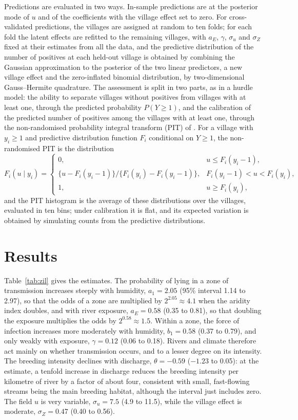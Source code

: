 \documentclass[11pt,a4paper]{article}
\begin{document}
Predictions are evaluated in two ways. In-sample predictions are at the posterior mode of $u$ and of the coefficients with the village effect set to zero. For cross-validated predictions, the villages are assigned at random to ten folds; for each fold the latent effects are refitted to the remaining villages, with $a_E$, $\gamma$, $\sigma_u$ and $\sigma_Z$ fixed at their estimates from all the data, and the predictive distribution of the number of positives at each held-out village is obtained by combining the Gaussian approximation to the posterior of the two linear predictors, a new village effect and the zero-inflated binomial distribution, by two-dimensional Gauss--Hermite quadrature. The assessment is split in two parts, as in a hurdle model: the ability to separate villages without positives from villages with at least one, through the predicted probability $P(Y \geq 1)$, and the calibration of the predicted number of positives among the villages with at least one, through the non-randomised probability integral transform (PIT) of \citet{czado2009}. For a village with $y_i \geq 1$ and predictive distribution function $F_i$ conditional on $Y \geq 1$, the non-randomised PIT is the distribution
\[
F_i(u \mid y_i) = \begin{cases} 0, & u \leq F_i(y_i - 1), \\ \{u - F_i(y_i - 1)\}/\{F_i(y_i) - F_i(y_i - 1)\}, & F_i(y_i - 1) < u < F_i(y_i), \\ 1, & u \geq F_i(y_i), \end{cases}
\]
and the PIT histogram is the average of these distributions over the villages, evaluated in ten bins; under calibration it is flat, and its expected variation is obtained by simulating counts from the predictive distributions.

\section{Results}

Table~\ref{tab:zil} gives the estimates. The probability of lying in a zone of transmission increases steeply with humidity, $a_1 = 2.05$ (95\% interval 1.14 to 2.97), so that the odds of a zone are multiplied by $2^{2.05} \approx 4.1$ when the aridity index doubles, and with river exposure, $a_E = 0.58$ (0.35 to 0.81), so that doubling the exposure multiplies the odds by $2^{0.58} \approx 1.5$. Within a zone, the force of infection increases more moderately with humidity, $b_1 = 0.58$ (0.37 to 0.79), and only weakly with exposure, $\gamma = 0.12$ (0.06 to 0.18). Rivers and climate therefore act mainly on whether transmission occurs, and to a lesser degree on its intensity. The breeding intensity declines with discharge, $\theta = -0.59$ ($-1.23$ to 0.05): at the estimate, a tenfold increase in discharge reduces the breeding intensity per kilometre of river by a factor of about four, consistent with small, fast-flowing streams being the main breeding habitat, although the interval just includes zero. The field $u$ is very variable, $\sigma_u = 7.5$ (4.9 to 11.5), while the village effect is moderate, $\sigma_Z = 0.47$ (0.40 to 0.56).
\end{document}
